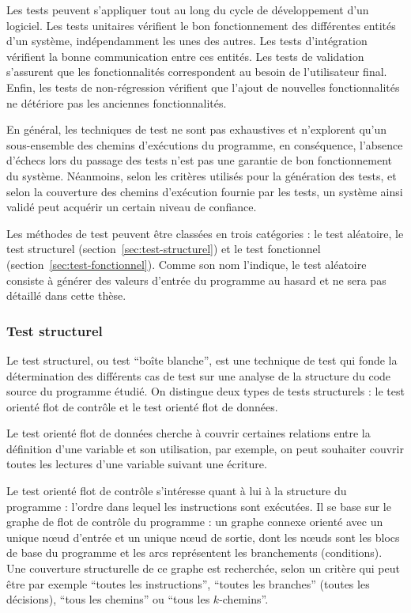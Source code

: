 Les tests peuvent s’appliquer tout au long du cycle de développement d’un
logiciel. Les tests unitaires vérifient le bon fonctionnement des différentes
entités d’un système, indépendamment les unes des autres. Les tests
d'intégration vérifient la bonne communication entre ces entités. Les tests de
validation s'assurent que les fonctionnalités correspondent au besoin de
l’utilisateur final. Enfin, les tests de non-régression vérifient que l'ajout de
nouvelles fonctionnalités ne détériore pas les anciennes fonctionnalités.

En général, les techniques de test ne sont pas exhaustives et n'explorent qu'un
sous-ensemble des chemins d'exécutions du programme, en conséquence, l’absence
d’échecs lors du passage des tests n’est pas une garantie de bon fonctionnement
du système. Néanmoins, selon les critères utilisés pour la génération des
tests, et selon la couverture des chemins d'exécution fournie par les tests, un
système ainsi validé peut acquérir un certain niveau de confiance.

Les méthodes de test peuvent être classées en trois catégories : le test
aléatoire, le test structurel (section~\ref{sec:test-structurel}) et le test
fonctionnel (section~\ref{sec:test-fonctionnel}). Comme son nom l'indique, le
test aléatoire consiste à générer des valeurs d'entrée du programme au hasard et
ne sera pas détaillé dans cette thèse.


\subsubsection*{Test structurel}
\label{sec:test-structurel}


Le test structurel, ou test ``boîte blanche'', est une technique de test qui
fonde la détermination des différents cas de test sur une analyse de la
structure du code source du programme étudié. On distingue deux types de tests
structurels : le test orienté flot de contrôle et le test orienté flot de
données.

Le test orienté flot de données cherche à couvrir certaines relations entre la
définition d’une variable et son utilisation, par exemple, on peut souhaiter
couvrir toutes les lectures d'une variable suivant une écriture.

Le test orienté flot de contrôle s’intéresse quant à lui à la structure du
programme : l'ordre dans lequel les instructions sont exécutées. Il se base sur
le graphe de flot de contrôle du programme : un graphe connexe orienté avec un
unique n\oe{}ud d’entrée et un unique n\oe{}ud de sortie, dont les n\oe{}uds
sont les blocs de base du programme et les arcs représentent les branchements
(conditions). Une couverture structurelle de ce graphe est recherchée, selon un
critère qui peut être par exemple ``toutes les instructions'',
``toutes les branches'' (toutes les décisions), ``tous les chemins'' ou
``tous les $k$-chemins''.

